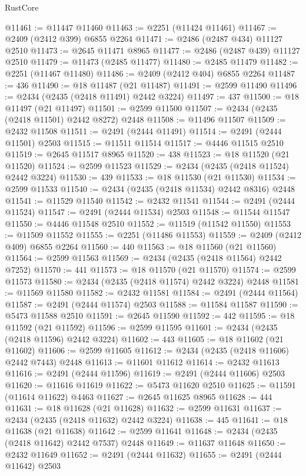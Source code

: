 \begin{lexlean}{RustCore}
\begin{coremodule}
@11461 := @11447 @11460
@11463 := @2251 (@11424 @11461)
@11467 := @2409 (@2412 @399) @6855 @2264
@11471 := @2486 (@2487 @434) @11127 @2510
@11473 := @2645 @11471 @8965
@11477 := @2486 (@2487 @439) @11127 @2510
@11479 := @11473 (@2485 @11477)
@11480 := @2485 @11479
@11482 := @2251 (@11467 @11480)
@11486 := @2409 (@2412 @404) @6855 @2264
@11487 := 436
@11490 := @18 @11487 (@21 @11487)
@11491 := @2599 @11490
@11496 := @2434 (@2435 (@2418 @11491) @2442 @3224)
@11497 := 437
@11500 := @18 @11497 (@21 @11497)
@11501 := @2599 @11500
@11507 := @2434 (@2435 (@2418 @11501) @2442 @8272) @2448
@11508 := @11496 @11507
@11509 := @2432 @11508
@11511 := @2491 (@2444 @11491)
@11514 := @2491 (@2444 @11501) @2503
@11515 := @11511 @11514
@11517 := @4446 @11515 @2510
@11519 := @2645 @11517 @8965
@11520 := 438
@11523 := @18 @11520 (@21 @11520)
@11524 := @2599 @11523
@11529 := @2434 (@2435 (@2418 @11524) @2442 @3224)
@11530 := 439
@11533 := @18 @11530 (@21 @11530)
@11534 := @2599 @11533
@11540 := @2434 (@2435 (@2418 @11534) @2442 @8316) @2448
@11541 := @11529 @11540
@11542 := @2432 @11541
@11544 := @2491 (@2444 @11524)
@11547 := @2491 (@2444 @11534) @2503
@11548 := @11544 @11547
@11550 := @4446 @11548 @2510
@11552 := @11519 (@11542 @11550)
@11553 := @11509 @11552
@11555 := @2251 (@11486 @11553)
@11559 := @2409 (@2412 @409) @6855 @2264
@11560 := 440
@11563 := @18 @11560 (@21 @11560)
@11564 := @2599 @11563
@11569 := @2434 (@2435 (@2418 @11564) @2442 @7252)
@11570 := 441
@11573 := @18 @11570 (@21 @11570)
@11574 := @2599 @11573
@11580 := @2434 (@2435 (@2418 @11574) @2442 @3224) @2448
@11581 := @11569 @11580
@11582 := @2432 @11581
@11584 := @2491 (@2444 @11564)
@11587 := @2491 (@2444 @11574) @2503
@11588 := @11584 @11587
@11590 := @5473 @11588 @2510
@11591 := @2645 @11590
@11592 := 442
@11595 := @18 @11592 (@21 @11592)
@11596 := @2599 @11595
@11601 := @2434 (@2435 (@2418 @11596) @2442 @3224)
@11602 := 443
@11605 := @18 @11602 (@21 @11602)
@11606 := @2599 @11605
@11612 := @2434 (@2435 (@2418 @11606) @2442 @7443) @2448
@11613 := @11601 @11612
@11614 := @2432 @11613
@11616 := @2491 (@2444 @11596)
@11619 := @2491 (@2444 @11606) @2503
@11620 := @11616 @11619
@11622 := @5473 @11620 @2510
@11625 := @11591 (@11614 @11622) @4463
@11627 := @2645 @11625 @8965
@11628 := 444
@11631 := @18 @11628 (@21 @11628)
@11632 := @2599 @11631
@11637 := @2434 (@2435 (@2418 @11632) @2442 @3224)
@11638 := 445
@11641 := @18 @11638 (@21 @11638)
@11642 := @2599 @11641
@11648 := @2434 (@2435 (@2418 @11642) @2442 @7537) @2448
@11649 := @11637 @11648
@11650 := @2432 @11649
@11652 := @2491 (@2444 @11632)
@11655 := @2491 (@2444 @11642) @2503

\end{coremodule}
\end{lexlean}
